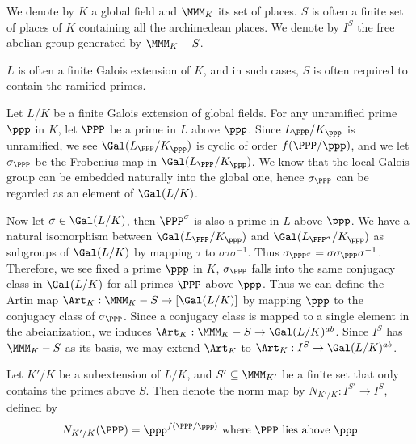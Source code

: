 

\begin{notation}
    We denote by $K$ a global field and $\MMM_K$ its set of places. $S$ is often a finite set of places of $K$ containing all the archimedean places. We denote by $I^S$ the free abelian group generated by $\MMM_K-S$.

    $L$ is often a finite Galois extension of $K$, and in such cases, $S$ is often required to contain the ramified primes.
\end{notation}

\begin{analysis}
     Let $L/K$ be a finite Galois extension of global fields. For any unramified prime $\ppp$ in $K$, let $\PPP$ be a prime in $L$ above $\ppp$. Since $L_\PPP/K_\ppp$ is unramified, we see $\Gal(L_\PPP/K_\ppp)$ is cyclic of order $f(\PPP/\ppp)$, and we let $\sigma_\PPP$ be the Frobenius map in $\Gal(L_\PPP/K_\ppp)$. We know that the local Galois group can be embedded naturally into the global one, hence $\sigma_\PPP$ can be regarded as an element of $\Gal(L/K)$.

     Now let $\sigma\in\Gal(L/K)$, then $\PPP^\sigma$ is also a prime in $L$ above $\ppp$. We have a natural isomorphism between $\Gal(L_\PPP/K_\ppp)$ and $\Gal(L_{\PPP^\sigma}/K_\ppp)$ as subgroups of $\Gal(L/K)$ by mapping $\tau$ to $\sigma\tau\sigma^{-1}$. Thus $\sigma_{\PPP^\sigma}=\sigma\sigma_\PPP\sigma^{-1}$. Therefore, we see fixed a prime $\ppp$ in $K$, $\sigma_\PPP$ falls into the same conjugacy class in $\Gal(L/K)$ for all primes $\PPP$ above $\ppp$. Thus we can define the Artin map $\Art_K:\MMM_K-S\to[\Gal(L/K)]$ by mapping $\ppp$ to the conjugacy class of $\sigma_\PPP$. Since a conjugacy class is mapped to a single element in the abeianization, we induces $\Art_K:\MMM_K-S\to\Gal(L/K)^{ab}$. Since $I^S$ has $\MMM_K-S$ as its basis, we may extend $\Art_K$ to $\Art_K:I^S\to\Gal(L/K)^{ab}$.
\end{analysis}

\begin{notation}
    Let $K'/K$ be a subextension of $L/K$, and $S'\subseteq\MMM_{K'}$ be a finite set that only contains the primes above $S$. Then denote the norm map by $N_{K'/K}:I^{S'}\rightarrow I^S$, defined by $$ N_{K'/K}(\PPP)=\ppp^{f(\PPP/\ppp)}\text{ where }\PPP\text{ lies above }\ppp $$
\end{notation}

